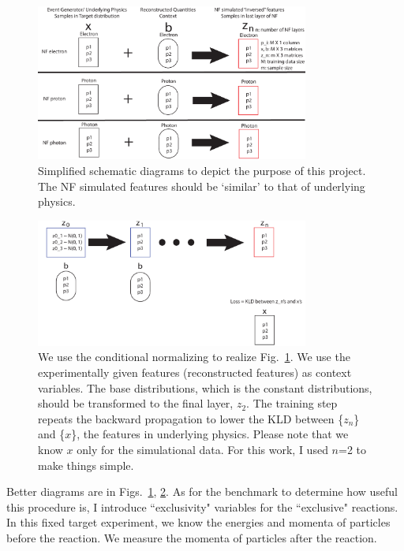 \begin{figure}[htb]
    \centering
    \includegraphics[width=0.8\textwidth]{Chapters/Ch3-Simulations/normalizing_flows/pics/MeetingFigures/Sangbaek/NFdiag1.pdf}
    \caption{Simplified schematic diagrams to depict the purpose of this project. The NF simulated features should be `similar' to that of underlying physics.}
    \label{fig:goal}
\end{figure}
\begin{figure}[htb]
    \centering
    \includegraphics[width=0.8\textwidth]{Chapters/Ch3-Simulations/normalizing_flows/pics/MeetingFigures/Sangbaek/NFdiag2.pdf}
    \caption{We use the conditional normalizing to realize Fig.~\ref{fig:goal}. We use the experimentally given features (reconstructed features) as context variables. The base distributions, which is the constant distributions, should be transformed to the final layer, $z_2$. The training step repeats the backward propagation to lower the KLD between \{$z_n$\} and \{$x$\}, the features in underlying physics. Please note that we know $x$ only for the simulational data. For this work, I used $n$=2 to make things simple.}
    \label{fig:architecture}
\end{figure}

Better diagrams are in Figs.~\ref{fig:goal}, \ref{fig:architecture}. As for the benchmark to determine how useful this procedure is, I introduce ``exclusivity" variables for the ``exclusive" reactions. In this fixed target experiment, we know the energies and momenta of particles before the reaction. We measure the momenta of particles after the reaction.

